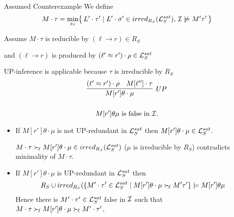 \documentclass[%
handout,
]{beamer}
\begin{document}
\begin{frame}[allowframebreaks]{Assumed Counterexample}
    \framebreak
    We define
    \begin{gather*}
        M\cdot\tau = \min_{\mathrel\succ_{\!\ell}}\!
\left\{\,
    L'\cdot\tau' \mid
    L'\cdot\sigma' \in irred_{R_S}(\mathcal{L}_S^{sat}),\,
    \mathcal{I} \not\models M'\tau'\,
\right\}
    \end{gather*}

Assume $M\cdot\tau$ is reducible by $(\ell\to r)\in R_S$

        and $(\ell\to r)$ is produced by $(\ell'\approx r')\cdot\rho\in\mathcal{L}_S^{sat}$

        \vspace{0.7em}
        UP-inference is applicable because $\tau$ is irreducible by $R_S$
        \begin{gather*}
            \infer[UP]
            {M[r']\theta\cdot\mu}
            {(\ell'\mEQ r')\cdot\rho & M[\ell'']\cdot\tau}
            \\
            \\
            M[r']\theta\mu\text{ is false in } \mcI.
        \end{gather*}


        \framebreak

        \begin{itemize}
            \item If $M[r']\theta\cdot\mu$ is not UP-redundant in $\mathcal{L}_S^{sat}$
            then $M[r']\theta\cdot\mu\in\mathcal{L}_S^{sat}$.

            \vspace{0.7em}
            $M\cdot\tau\mathrel\succ_{\!\ell}
            M[r']\theta\cdot\mu\in irred_{R_S}(\mathcal{L}_S^{sat})$ ($\mu$ is irreducible by $R_S$)
            contradicts minimality of $M\cdot\tau$.


            \vspace{0.7em}
            \item If $M[r']\theta\cdot\mu$ is UP-redundant in $\mathcal{L}_S^{sat}$ then
            \begin{gather*}
                R_S \cup irred_{R_S}(
                \{
                    M'\cdot\tau'\in\mathcal{L}_S^{sat}\mid
                    M[r']\theta\cdot\mu \mathrel\succ_{\!\ell} M'\tau'
                    \} \models M[r']\theta\mu
            \end{gather*}
            Hence there is $M'\cdot\tau'\in\mathcal{L}_S^{sat}$ false in $\mathcal{I}$ such that
            $M\cdot\tau\mathrel\succ_{\!\ell} M[r']\theta\cdot\mu\mathrel\succ_{\!\ell} M'\cdot\tau'$,


\end{itemize}
\end{frame}
\end{document}
